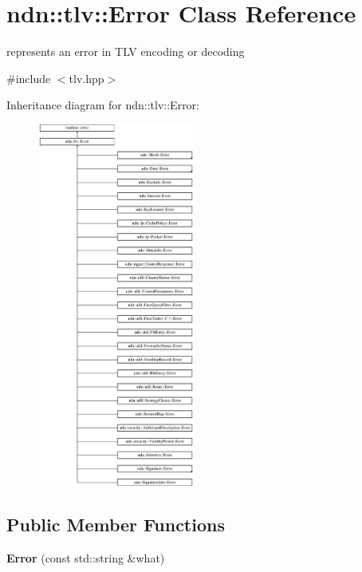 \hypertarget{classndn_1_1tlv_1_1Error}{}\section{ndn\+:\+:tlv\+:\+:Error Class Reference}
\label{classndn_1_1tlv_1_1Error}


represents an error in T\+LV encoding or decoding  




{\ttfamily \#include $<$tlv.\+hpp$>$}

Inheritance diagram for ndn\+:\+:tlv\+:\+:Error\+:\begin{figure}[H]
\begin{center}
\leavevmode
\includegraphics[height=12.000000cm]{classndn_1_1tlv_1_1Error}
\end{center}
\end{figure}
\subsection*{Public Member Functions}
\begin{DoxyCompactItemize}
\item 
{\bfseries Error} (const std\+::string \&what)\hypertarget{classndn_1_1tlv_1_1Error_a41f15929c14fce9b95d5f18b5b8b030e}{}\label{classndn_1_1tlv_1_1Error_a41f15929c14fce9b95d5f18b5b8b030e}

\end{DoxyCompactItemize}


